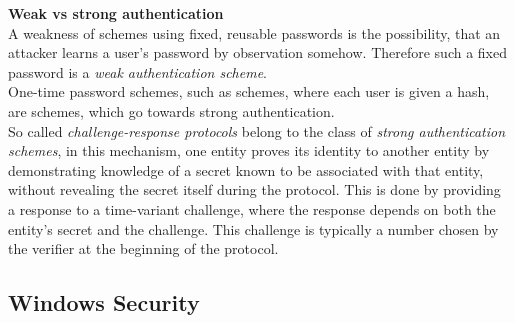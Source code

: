 \documentclass[a4paper, 10 pt, conference]{ieeeconf}
\begin{document}
\textbf{Weak vs strong authentication} \\
A weakness of schemes using fixed, reusable passwords is the possibility, that an attacker learns a user's password by observation somehow. Therefore such a fixed password is a \emph{weak authentication scheme}. \\
One-time password schemes, such as schemes, where each user is given a hash, are schemes, which go towards strong authentication. \\
So called \emph{challenge-response protocols} belong to the class of \emph{strong authentication schemes}, in this mechanism, one entity proves its identity to another entity by demonstrating knowledge of a secret known to be associated with that entity, without revealing the secret itself during the protocol. 
This is done by providing a response to a time-variant challenge, where the response depends on both the entity's secret and the challenge. This challenge is typically a number chosen by the verifier at the beginning of the protocol. 



\subsection{\textbf{Windows Security}}
\end{document}
